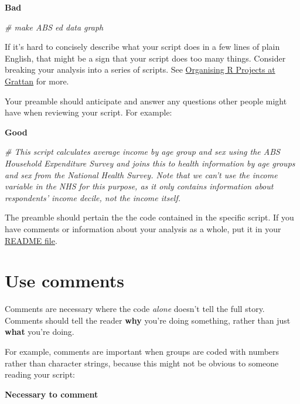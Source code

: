 \documentclass[]{book}
\newenvironment{Shaded}{\begin{snugshade}}{\end{snugshade}}
\newcommand{\CommentTok}[1]{\textcolor[rgb]{0.56,0.35,0.01}{\textit{#1}}}
\newcommand{\DecValTok}[1]{\textcolor[rgb]{0.00,0.00,0.81}{#1}}
\newcommand{\KeywordTok}[1]{\textcolor[rgb]{0.13,0.29,0.53}{\textbf{#1}}}
\newcommand{\NormalTok}[1]{#1}
\newcommand{\OperatorTok}[1]{\textcolor[rgb]{0.81,0.36,0.00}{\textbf{#1}}}
\newcommand{\StringTok}[1]{\textcolor[rgb]{0.31,0.60,0.02}{#1}}
\begin{document}
\textbf{Bad}

\begin{Shaded}
\begin{Highlighting}[]
\CommentTok{# make ABS ed data graph}
\end{Highlighting}
\end{Shaded}

If it's hard to concisely describe what your script does in a few lines of plain English, that might be a sign that your script does too many things. Consider breaking your analysis into a series of scripts. See \protect\hyperlink{organising-projects}{Organising R Projects at Grattan} for more.

Your preamble should anticipate and answer any questions other people might have when reviewing your script. For example:

\textbf{Good}

\begin{Shaded}
\begin{Highlighting}[]
\CommentTok{# This script calculates average income by age group and sex using the ABS Household Expenditure Survey and joins this to health information by age groups and sex from the National Health Survey. Note that we can't use the income variable in the NHS for this purpose, as it only contains information about respondents' income decile, not the income itself.}
\end{Highlighting}
\end{Shaded}

The preamble should pertain the the code contained in the specific script. If you have comments or information about your analysis as a whole, put it in your \protect\hyperlink{README}{README file}.

\hypertarget{use-comments}{%
\section{Use comments}\label{use-comments}}

Comments are necessary where the code \emph{alone} doesn't tell the full story. Comments should tell the reader \textbf{why} you're doing something, rather than just \textbf{what} you're doing.

For example, comments are important when groups are coded with numbers rather than character strings, because this might not be obvious to someone reading your script:

\textbf{Necessary to comment}

\begin{Shaded}
\end{Shaded}
\end{document}
